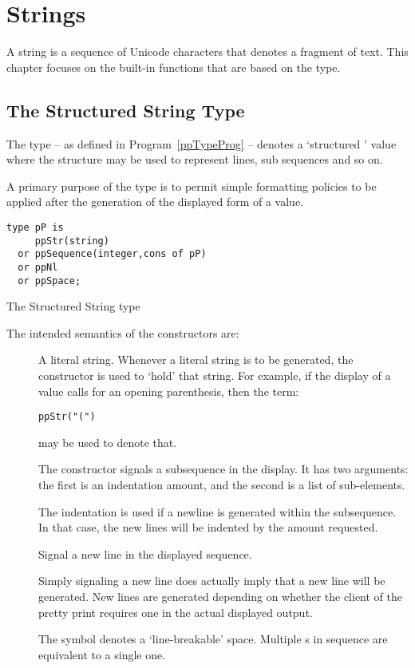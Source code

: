 \chapter{Strings}
\label{strings}
A string is a sequence of Unicode characters that denotes a fragment of text. This chapter focuses on the built-in functions that are based on the  type.

\section{The Structured String  Type}
\label{ppType}
The  type -- as defined in Program~\vref{ppTypeProg} -- denotes a `structured ' value where the structure may be used to represent lines, sub sequences and so on.
\begin{aside}
A primary purpose of the  type is to permit simple formatting policies to be applied after the generation of the displayed form of a value.
\end{aside} 

\begin{program}
\begin{lstlisting}
type pP is 
     ppStr(string)
  or ppSequence(integer,cons of pP)
  or ppNl
  or ppSpace;
\end{lstlisting}
\caption{The Structured String  type}\label{ppTypeProg}
\end{program}

The intended semantics of the constructors are:
\begin{description}
\item[] A literal string. Whenever a literal string is to be generated, the  constructor is used to `hold' that string. For example, if the display of a value calls for an opening parenthesis, then the term:
\begin{lstlisting}
ppStr("(")
\end{lstlisting}
may be used to denote that.
\item[]
The  constructor signals a subsequence in the display. It has two arguments: the first is an indentation amount, and the second is a  list of sub-elements.

The indentation is used if a newline is generated within the subsequence. In that case, the new lines will be indented by the amount requested.
\item[]
Signal a new line in the displayed sequence. 
\begin{aside}
Simply signaling a new line does actually imply that a new line will be generated. New lines are generated depending on whether the client of the pretty print requires one in the actual displayed output.
\end{aside}
\item[]
The  symbol denotes a `line-breakable' space. Multiple s in sequence are equivalent to a single one.
\end{description}

